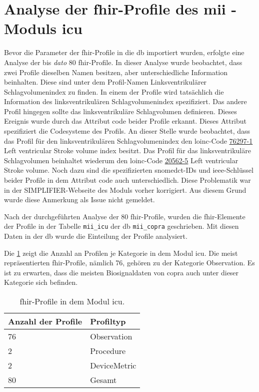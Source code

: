 \section{Analyse der \acs{fhir}-Profile des \acs{mii} - Moduls \acs{icu}} \label{sec:fhiricuresult}

Bevor die Parameter der \ac{fhir}-Profile in die \ac{db} importiert wurden, erfolgte eine Analyse der bis \textit{dato} 80 \ac{fhir}-Profile. In dieser Analyse wurde beobachtet, dass zwei Profile dieselben Namen besitzen, aber unterschiedliche Information beinhalten. Diese sind unter dem Profil-Namen \glqq Linksventrikulärer Schlagvolumenindex\grqq{} zu finden. In einem der Profile wird tatsächlich die Information des linksventrikulären Schlagvolumenindex spezifiziert. Das andere Profil hingegen sollte das linksventrikuläre Schlagvolumen definieren. Dieses Ereignis wurde durch das Attribut \glqq code\grqq{} beider Profile erkannt. Dieses Attribut spezifiziert die Codesysteme des Profils. An dieser Stelle wurde beobachtet, dass das Profil für den linksventrikulären Schlagvolumenindex den \ac{loinc}-Code \href{https://loinc.org/76297-1/}{76297-1} \glqq Left ventricular Stroke volume index\grqq{} besitzt. Das Profil für das linksventrikuläre Schlagvolumen beinhaltet wiederum den \ac{loinc}-Code \href{https://loinc.org/20562-5/}{20562-5} \glqq Left ventricular Stroke volume\grqq{}. Noch dazu sind die spezifizierten \ac{snomedct}-IDs und \ac{ieee}-Schlüssel beider Profile in dem Attribut \glqq code\grqq{} auch unterschiedlich. Diese Problematik war in der SIMPLIFIER-Webseite des Moduls vorher korrigiert. Aus diesem Grund wurde diese Anmerkung als Issue nicht gemeldet.

Nach der durchgeführten Analyse der 80 \acs{fhir}-Profile, wurden die \ac{fhir}-Elemente der Profile in der Tabelle \texttt{mii\_icu} der \ac{db} \texttt{mii\_copra} geschrieben. Mit diesen Daten in der \ac{db} wurde die Einteilung der Profile analysiert.

Die \ref{tab:proficu} zeigt die Anzahl an Profilen je Kategorie in dem Modul \glqq\ac{icu}\grqq{}. Die meist repräsentierten \ac{fhir}-Profile, nämlich 76, gehören zu der Kategorie \glqq Observation\grqq{}. Es ist zu erwarten, dass die meisten Biosignaldaten von \ac{copra} auch unter dieser Kategorie sich befinden.

\begin{table}[ht]
	\centering 
	\caption[\acs{fhir}-Profile in dem Modul \acs{icu}]{\acs{fhir}-Profile in dem Modul \acs{icu}.}
	\label{tab:proficu}
	\begin{tabular}{|l|l|}
		\hline
		\bfseries Anzahl der Profile & \bfseries Profiltyp \\ \hline
		76 & Observation \\ \hline
		2 & Procedure \\ \hline   
		2 & DeviceMetric \\ \hline
		80 & Gesamt \\ \hline
	\end{tabular}
\end{table}

